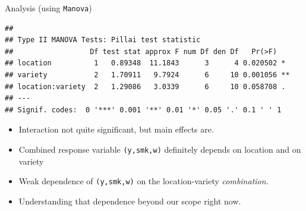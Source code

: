 \begin{frame}[fragile]{Analysis (using \texttt{Manova})}

{\footnotesize  
 
\begin{knitrout}
\color{fgcolor}\begin{kframe}
\begin{alltt}
\hlkwb{=}\hlopt{~}\hlopt{*}
\hlkwb{=}\hlopt{::}
\end{alltt}
\begin{verbatim}
## 
## Type II MANOVA Tests: Pillai test statistic
##                  Df test stat approx F num Df den Df   Pr(>F)   
## location          1   0.89348  11.1843      3      4 0.020502 * 
## variety           2   1.70911   9.7924      6     10 0.001056 **
## location:variety  2   1.29086   3.0339      6     10 0.058708 . 
## ---
## Signif. codes:  0 '***' 0.001 '**' 0.01 '*' 0.05 '.' 0.1 ' ' 1
\end{verbatim}
\end{kframe}
\end{knitrout}
}  

\begin{itemize}
\item Interaction not quite significant, but main effects are.
\item Combined response variable \texttt{(y,smk,w)} definitely depends
  on location and on variety
\item Weak dependence of \texttt{(y,smk,w)} on the location-variety \emph{combination.}
\item Understanding that dependence beyond our scope right now.
\end{itemize}

  
\end{frame}
